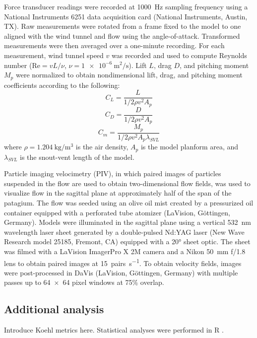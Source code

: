 \documentclass[10pt]{article}
\begin{document}
Force transducer readings were recorded at \SI{1000}{\hertz} sampling frequency using a National Instruments 6251 data acquisition card (National Instruments, Austin, TX).  Raw measurements were rotated from a frame fixed to the model to one aligned with the wind tunnel and flow using the angle-of-attack.  Transformed measurements were then averaged over a one-minute recording.  For each measurement, wind tunnel speed $v$ was recorded and used to compute Reynolds number ($\mbox{Re} = vL/\nu$, $\nu = \SI{1e-6}{\meter\squared\per\second}$).  Lift $L$, drag $D$, and pitching moment $M_p$ were normalized to obtain nondimensional lift, drag, and pitching moment coefficients according to the following: 
\begin{equation}
C_L = \frac{L}{1/2 \rho v^2 A_p}
\end{equation}
\begin{equation}
C_D = \frac{D}{1/2 \rho v^2 A_p}
\end{equation}
\begin{equation}
C_m = \frac{M_p}{1/2 \rho v^2 A_p \lambda_{SVL}}
\end{equation}
where $\rho=\SI{1.204}{\kilo\gram\per\meter\cubed}$ is the air density, $A_p$ is the model planform area, and $\lambda_{SVL}$ is the snout-vent length of the model. 

Particle imaging velocimetry (PIV), in which paired images of particles suspended in the flow are used to obtain two-dimensional flow fields, was used to visualize flow in the sagittal plane at approximately half of the span of the patagium.  The flow was seeded using an olive oil mist created by a pressurized oil container equipped with a perforated tube atomizer (LaVision, G\"ottingen, Germany). Models were illuminated in the sagittal plane using a vertical \SI{532}{\nano\meter} wavelength laser sheet generated by a double-pulsed Nd:YAG laser (New Wave Research model 25185, Fremont, CA) equipped with a \ang{20} sheet optic.  The sheet was filmed with a LaVision ImagerPro X 2M camera and a Nikon \SI{50}{\milli\meter} f/1.8 lens to obtain paired images at \SI{15}{pairs\per\second}.  To obtain velocity fields, images were post-processed in DaVis (LaVision, G\"ottingen, Germany) with multiple passes up to \num{64 x 64} pixel windows at 75\% overlap.

\subsection{Additional analysis}
Introduce Koehl metrics here. Statistical analyses were performed in R \citep{R:2009}.
\end{document}
